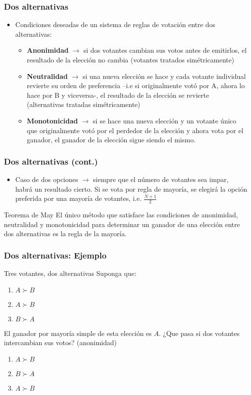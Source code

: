 \documentclass[14pt,aspectratio=169]{beamer}
\begin{document}
  
\begin{frame}\frametitle{Dos alternativas}
\begin{itemize}
\item Condiciones deseadas de un sistema de reglas de votación entre dos
  alternativas:
\begin{itemize}
\item \textbf{Anonimidad} $\longrightarrow$ si dos votantes cambian sus votos
  antes de emitirlos, el resultado de la elección no cambia (votantes
  tratados simétricamente)
\item \textbf{Neutralidad} $\longrightarrow$ si una nueva elección se hace y
  cada votante individual revierte su orden de preferencia --i.e si
  originalmente votó por A, ahora lo hace por B y viceversa-, el
  resultado de la elección se revierte (alternativas tratadas simétricamente)
\item \textbf{Monotonicidad} $\longrightarrow$ si se hace una nueva elección y
  un votante único que originalmente votó por el perdedor de la
  elección y ahora vota por el ganador, el ganador de la elección
  sigue siendo el mismo.
\end{itemize}
\end{itemize}
\end{frame}



\begin{frame}\frametitle{Dos alternativas (cont.)}
\begin{itemize}
\item Caso de dos opciones $\longrightarrow$ siempre que el número de votantes sea impar, habrá un resultado cierto. Si se vota por regla de mayoría, se elegirá la opción preferida por una mayoría de votantes, i.e. $ \frac{N+1}{2} $
\end{itemize}
\begin{block}{Teorema de May}
El único método que satisface las condiciones de anonimidad,
neutralidad y monotonicidad para determinar un
ganador de una elección entre dos alternativas es la regla de la
mayoría.
\end{block}
\end{frame}


\begin{frame}\frametitle{Dos alternativas: Ejemplo}
\begin{block}{Tres votantes, dos alternativas}
Suponga que:
\begin{enumerate}
\item $A \succ B$
\item $A \succ B$
\item $B \succ A$
\end{enumerate}
\item El ganador por mayoría simple de esta elección es $A$.
¿Que pasa si dos votantes intercambian sus votos? (anonimidad)
\begin{enumerate}
\item $A \succ B$
\item $B \succ A$
\item $A \succ B$
\end{enumerate}
\end{block}
\end{frame}
\end{document}
